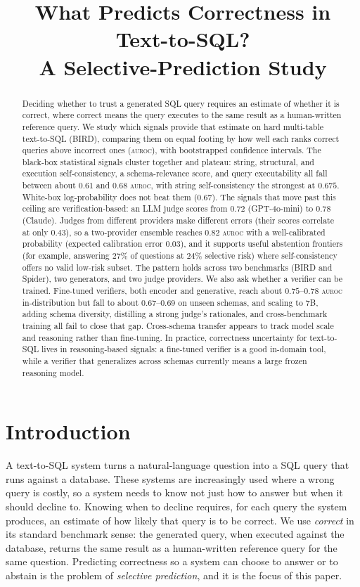 \documentclass[11pt]{article}
\title{What Predicts Correctness in Text-to-SQL?\\ A Selective-Prediction Study}
\author{}
\date{}
\newcommand{\auroc}{\textsc{auroc}}
\begin{document}
\maketitle

\begin{abstract}
Deciding whether to trust a generated SQL query requires an estimate of whether it is correct, where
correct means the query executes to the same result as a human-written reference query. We study
which signals provide that estimate on hard multi-table text-to-SQL (BIRD), comparing them on equal
footing by how well each ranks correct queries above incorrect ones (\auroc{}), with bootstrapped
confidence intervals. The black-box statistical signals cluster
together and plateau: string, structural, and execution self-consistency, a schema-relevance score,
and query executability all fall between about $0.61$ and $0.68$ \auroc{}, with string
self-consistency the strongest at $0.675$. White-box log-probability does not beat them ($0.67$). The
signals that move past this ceiling are verification-based: an LLM judge scores from $0.72$
(GPT-4o-mini) to $0.78$ (Claude). Judges from different providers make different errors (their scores
correlate at only $0.43$), so a two-provider ensemble reaches $0.82$ \auroc{} with a well-calibrated
probability (expected calibration error $0.03$), and it supports useful abstention frontiers (for
example, answering $27\%$ of questions at $24\%$ selective risk) where self-consistency offers no
valid low-risk subset. The pattern holds across two benchmarks (BIRD and Spider), two generators, and
two judge providers. We also ask whether a verifier can be trained. Fine-tuned verifiers, both encoder and generative, reach about
$0.75$--$0.78$ \auroc{} in-distribution but fall to about $0.67$--$0.69$ on unseen schemas, and scaling to
7B, adding schema diversity, distilling a strong judge's rationales, and cross-benchmark training all
fail to close that gap. Cross-schema transfer appears to track model scale and reasoning rather than
fine-tuning. In practice, correctness uncertainty for text-to-SQL lives in reasoning-based signals: a
fine-tuned verifier is a good in-domain tool, while a verifier that generalizes across schemas
currently means a large frozen reasoning model.
\end{abstract}

\section{Introduction}
A text-to-SQL system turns a natural-language question into a SQL query that runs against a database.
These systems are increasingly used where a wrong query is costly, so a system needs to know not just
how to answer but when it should decline to. Knowing when to decline requires, for each query the
system produces, an estimate of how likely that query is to be correct. We use \emph{correct} in its
standard benchmark sense: the generated query, when executed against the database, returns the same
result as a human-written reference query for the same question. Predicting correctness so a system
can choose to answer or to abstain is the problem of \emph{selective prediction}, and it is the focus
of this paper.
\end{document}

